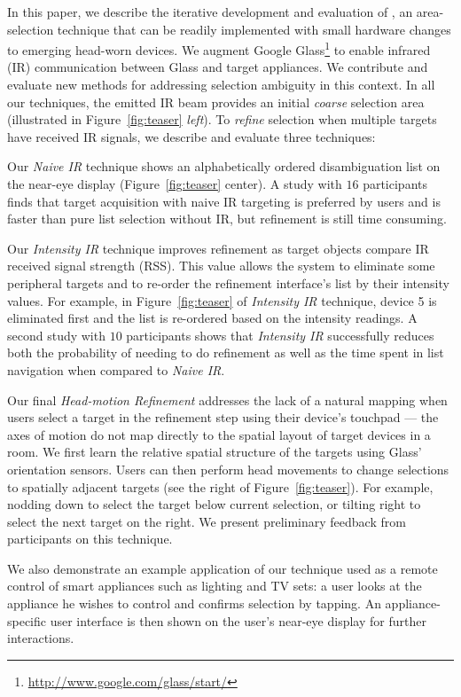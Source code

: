 In this paper, we describe the iterative development and evaluation of \systemnamenospace, an area-selection technique that can be readily implemented with small hardware changes to emerging head-worn devices. We augment Google Glass\footnote{\url{http://www.google.com/glass/start/}} to enable infrared (IR) communication between Glass and target appliances. We contribute and evaluate new methods for addressing selection ambiguity in this context. In all our techniques, the emitted IR beam %
 provides an initial {\em coarse} selection area (illustrated in Figure~\ref{fig:teaser} {\em left}). To {\em refine} selection when multiple targets have received IR signals, we describe and evaluate three techniques:

 Our {\em Naive IR} technique shows an alphabetically ordered disambiguation list on the near-eye display (Figure~\ref{fig:teaser} center). A study with $16$ participants finds that target acquisition with naive IR targeting is preferred by users and is faster than pure list selection without IR, but refinement is still time consuming.

Our {\em Intensity IR} technique improves refinement as target objects compare IR received signal strength (RSS). This value allows the system to eliminate some peripheral targets and to re-order the refinement interface's list by their intensity values. For example, in Figure~\ref{fig:teaser} of {\em Intensity IR} technique, device 5 is eliminated first and the list is re-ordered based on the intensity readings. A second study with $10$ participants shows that {\em Intensity IR} successfully reduces both the probability of needing to do refinement as well as the time spent in list navigation when compared to {\em Naive IR}.

Our final {\em Head-motion Refinement} addresses the lack of a natural mapping when users select a target in the refinement step using their device's touchpad --- the axes of motion do not map directly to the spatial layout of target devices in a room. We first learn the relative spatial structure of the targets using Glass' orientation sensors. Users can then perform head movements to change selections to spatially adjacent targets (see the right of Figure~\ref{fig:teaser}). For example, nodding down to select the target below current selection, or tilting right to select the next target on the right. We present preliminary feedback from participants on this technique.

We also demonstrate an example application of our technique used as a remote control of smart appliances such as lighting and TV sets: a user looks at the appliance he wishes to control and confirms selection by tapping. An appliance-specific user interface is then shown on the user's near-eye display for further interactions.

